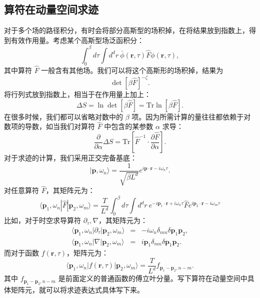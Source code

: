 \documentclass[UTF8]{ctexart}
\def\Tr{\mathrm{Tr}}
\begin{document}
\subsection*{算符在动量空间求迹}
\noindent 
对于多个场的路径积分，有时会将部分高斯型的场积掉，在将结果放到指数上，得到有效作用量。考虑某个高斯型场泛函积分：
\begin{equation}
	\int_0^\beta d\tau \int d^d r\ \bar\phi(\bm r,\tau) \hat F \phi(\bm r,\tau),
\end{equation}
其中算符 $\hat F$ 一般含有其他场。我们可以将这个高斯形的场积掉，结果为
\begin{equation}
	\det[\beta \hat F ]^{-\zeta}.
\end{equation}
将行列式放到指数上，相当于在作用量上加上：
\begin{equation}
	\Delta S
	= \ln\det\left[\beta \hat F \right]
	= \Tr \ln \left[\beta \hat F \right].
\end{equation}
在很多时候，我们都可以省略对数中的 $\beta$ 项。因为所需计算的量往往都依赖于对数项的导数，如当我们对算符 $\hat F$ 中包含的某参数 $\alpha$ 求导：
\begin{equation}
	\frac{\partial}{\partial \alpha}\Delta S
	= \Tr \left[\hat F^{-1}\cdot \frac{\partial \hat F}{\partial \alpha}  \right].
\end{equation}
对于求迹的计算，我们采用正交完备基底：
\begin{equation}
	|\bm p, \omega_n \rangle = \frac{1}{\sqrt{\beta L^d}} e^{i\bm p\cdot \bm r - i\omega_n \tau}.
\end{equation}
对任意算符 $\hat F$，其矩阵元为：
\begin{equation}
	\langle \bm p_1, \omega_n| \hat F |\bm p_2, \omega_m \rangle
	= \frac{T}{L^d} \int_0^\beta d\tau \int d^d r\ e^{-i\bm p_1 \cdot \bm r+i\omega_n \tau} \hat F e^{i\bm p_2 \cdot \bm r-i\omega_m \tau}
\end{equation}
比如，对于时空求导算符 $\partial_\tau, \nabla$，其矩阵元为：
\begin{eqnarray}
	\langle \bm p_1, \omega_n| \partial_\tau |\bm p_2, \omega_m \rangle
	&=& -i\omega_n \delta_{mn}\delta{\bm p_1 \bm p_2}, \\
	\langle \bm p_1, \omega_n| \nabla |\bm p_2, \omega_m \rangle
	&=& i\bm p_1 \delta_{mn}\delta{\bm p_1 \bm p_2}.
\end{eqnarray}
而对于函数 $f(\bm r,\tau)$，矩阵元为：
\begin{equation}
	\langle \bm p_1, \omega_n| f(\bm r,\tau) |\bm p_2, \omega_m \rangle
	= \frac{T}{L^d} f_{\bm p_1-\bm p_2, n-m}.
\end{equation}
其中 $f_{\bm p_1-\bm p_2, n-m}$ 是前面定义的普通函数的傅立叶分量。写下算符在动量空间中具体矩阵元，就可以将求迹表达式具体写下来。
\end{document}
